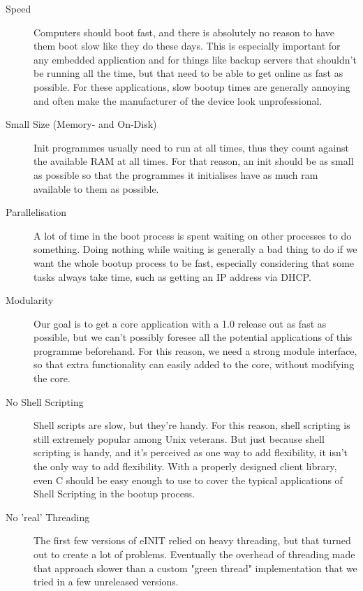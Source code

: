 \documentclass[a4paper,twoside,titlepage]{article}
\begin{document}
\begin{description}
\item[Speed]
Computers should boot fast, and there is absolutely no reason to have them boot
slow like they do these days. This is especially important for any embedded
application and for things like backup servers that shouldn't be running all the
time, but that need to be able to get online as fast as possible. For these
applications, slow bootup times are generally annoying and often make the
manufacturer of the device look unprofessional.

\item[Small Size (Memory- and On-Disk)]
Init programmes usually need to run at all times, thus they count against the
available RAM at all times. For that reason, an init should be as small as
possible so that the programmes it initialises have as much ram available to
them as possible.

\item[Parallelisation]
A lot of time in the boot process is spent waiting on other processes to do
something. Doing nothing while waiting is generally a bad thing to do if we want
the whole bootup process to be fast, especially considering that some tasks
always take time, such as getting an IP address via DHCP.

\item[Modularity]
Our goal is to get a core application with a 1.0 release out as fast as
possible, but we can't possibly foresee all the potential applications of this
programme beforehand. For this reason, we need a strong module interface, so
that extra functionality can easily added to the core, without modifying the
core.

\item[No Shell Scripting]
Shell scripts are slow, but they're handy. For this reason, shell scripting is
still extremely popular among Unix veterans. But just because shell scripting is
handy, and it's perceived as one way to add flexibility, it isn't the only way
to add flexibility. With a properly designed client library, even C should be
easy enough to use to cover the typical applications of Shell Scripting in the
bootup process.

\item[No 'real' Threading]
The first few versions of eINIT relied on heavy threading, but that turned out
to create a lot of problems. Eventually the overhead of threading made that
approach slower than a custom "green thread" implementation that we tried in a
few unreleased versions.


\end{description}
\end{document}
